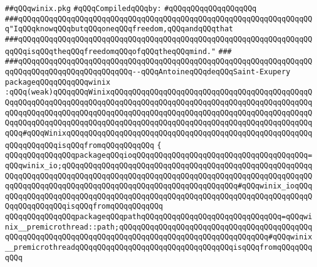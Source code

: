 \label{src/lib/std/winix.pkg}
\verb|##qQQqwinix.pkg|\newline
\newline
\verb|#qQQqCompiledqQQqby:|\newline
\verb|#qQQqqQQqqQQqqQQqqQQq|\newline
\newline
\newline
\newline
\verb|###qQQqqQQqqQQqqQQqqQQqqQQqqQQqqQQqqQQqqQQqqQQqqQQqqQQqqQQqqQQqqQQqqQQq"IqQQqknowqQQqbutqQQqoneqQQqfreedom,qQQqandqQQqthat|\newline
\verb|###qQQqqQQqqQQqqQQqqQQqqQQqqQQqqQQqqQQqqQQqqQQqqQQqqQQqqQQqqQQqqQQqqQQqqQQqisqQQqtheqQQqfreedomqQQqofqQQqtheqQQqmind."|\newline
\verb|###|\newline
\verb|###qQQqqQQqqQQqqQQqqQQqqQQqqQQqqQQqqQQqqQQqqQQqqQQqqQQqqQQqqQQqqQQqqQQqqQQqqQQqqQQqqQQqqQQqqQQqqQQq--qQQqAntoineqQQqdeqQQqSaint-Exupery|\newline
\newline
\newline
\newline
\verb|packageqQQqqQQqqQQqwinix|\newline
\verb|:qQQq(weak)qQQqqQQqWinixqQQqqQQqqQQqqQQqqQQqqQQqqQQqqQQqqQQqqQQqqQQqqQQqqQQqqQQqqQQqqQQqqQQqqQQqqQQqqQQqqQQqqQQqqQQqqQQqqQQqqQQqqQQqqQQqqQQqqQQqqQQqqQQqqQQqqQQqqQQqqQQqqQQqqQQqqQQqqQQqqQQqqQQqqQQqqQQqqQQqqQQqqQQqqQQqqQQqqQQqqQQqqQQqqQQqqQQqqQQqqQQqqQQqqQQqqQQqqQQqqQQqqQQqqQQqqQQqqQQq#qQQqWinixqQQqqQQqqQQqqQQqqQQqqQQqqQQqqQQqqQQqqQQqqQQqqQQqqQQqqQQqqQQqqQQqqQQqisqQQqfromqQQqqQQqqQQq|\newline
\verb|{|\newline
\verb|qQQqqQQqqQQqqQQqpackageqQQqioqQQqqQQqqQQqqQQqqQQqqQQqqQQqqQQqqQQqqQQq=qQQqwinix_io;qQQqqQQqqQQqqQQqqQQqqQQqqQQqqQQqqQQqqQQqqQQqqQQqqQQqqQQqqQQqqQQqqQQqqQQqqQQqqQQqqQQqqQQqqQQqqQQqqQQqqQQqqQQqqQQqqQQqqQQqqQQqqQQqqQQqqQQqqQQqqQQqqQQqqQQqqQQqqQQqqQQqqQQqqQQqqQQqqQQq#qQQqwinix_ioqQQqqQQqqQQqqQQqqQQqqQQqqQQqqQQqqQQqqQQqqQQqqQQqqQQqqQQqqQQqqQQqqQQqqQQqqQQqqQQqqQQqqQQqisqQQqfromqQQqqQQqqQQq|\newline
\verb|qQQqqQQqqQQqqQQqpackageqQQqpathqQQqqQQqqQQqqQQqqQQqqQQqqQQqqQQq=qQQqwinix__premicrothread::path;qQQqqQQqqQQqqQQqqQQqqQQqqQQqqQQqqQQqqQQqqQQqqQQqqQQqqQQqqQQqqQQqqQQqqQQqqQQqqQQqqQQqqQQqqQQqqQQqqQQqqQQq#qQQqwinix__premicrothreadqQQqqQQqqQQqqQQqqQQqqQQqqQQqqQQqqQQqisqQQqfromqQQqqQQqqQQq|\newline
